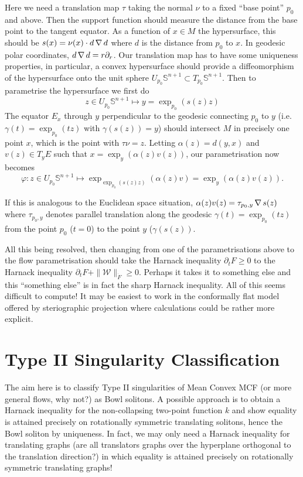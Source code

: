 \documentclass{amsart}
\begin{document}
\begin{itemize}
Here we need a translation map $\tau$ taking the normal $\nu$ to a fixed ``base point'' $p_0$ and above. Then the support function should measure the distance from the base point to the tangent equator. As a function of $x\in M$ the hypersurface, this should be $s(x) = \nu(x) \cdot d \operatorname{\nabla} d$ where $d$ is the distance from $p_0$ to $x$. In geodesic polar coordinates, $d \operatorname{\nabla} d = r \partial_r$. Our translation map has to have some uniqueness properties, in particular, a convex hypersurface should provide a diffeomorphism of the hypersurface onto the unit sphere $U_{p_0} \mathbb{S}^{n+1} \subset T_{p_0} \mathbb{S}^{n+1}$. Then to parametrise the hypersurface we first do
\[
z \in U_{p_0} \mathbb{S}^{n+1} \mapsto y = \exp_{p_0} (s(z) z)
\]
The equator $E_x$ through $y$ perpendicular to the geodesic connecting $p_0$ to $y$ (i.e. $\gamma(t) = \exp_{p_0} (t z)$ with $\gamma(s(z)) = y$) should intersect $M$ in precisely one point $x$, which is the point with $\tau \nu = z$. Letting $\alpha(z) = d(y, x)$ and \(v(z) \in T_y E\) such that \(x = \exp_y(\alpha(z) v(z))\), our parametrisation now becomes
\[
\varphi: z \in U_{p_0} \mathbb{S}^{n+1} \mapsto \exp_{\exp_{p_0} (s(z) z)} (\alpha(z) v) = \exp_{y} (\alpha(z) v(z)).
\]

If this is analogous to the Euclidean space situation, \(\alpha(z) v(z) = \tau_{p_0,y} \operatorname{\nabla} s (z)\) where \(\tau_{p_0,y}\) denotes parallel translation along the geodesic \(\gamma(t) = \exp_{p_0} (t z)\) from the point \(p_0\) (\(t=0\)) to the point \(y\) (\(\gamma(s(z))\). 
\end{itemize}

All this being resolved, then changing from one of the parametrisations above to the flow parametrisation should take the Harnack inequality $\partial_t F \geq 0$ to the Harnack inequality \(\partial_t F + \|\mathcal{W}\|_{\dot{F}} \geq 0\). Perhaps it takes it to something else and this ``something else'' is in fact the sharp Harnack inequality. All of this seems difficult to compute! It may be easiest to work in the conformally flat model offered by steriographic projection where calculations could be rather more explicit.

\section{Type II Singularity Classification}

The aim here is to classify Type II singularities of Mean Convex MCF (or more general flows, why not?) as Bowl solitons. A possible approach is to obtain a Harnack inequality for the non-collapsing two-point function $k$ and show equality is attained precisely on rotationally symmetric translating solitons, hence the Bowl soliton by uniqueness. In fact, we may only need a Harnack inequality for translating graphs (are all translators graphs over the hyperplane orthogonal to the translation direction?) in which equality is attained precisely on rotationally symmetric translating graphs!
\end{document}
